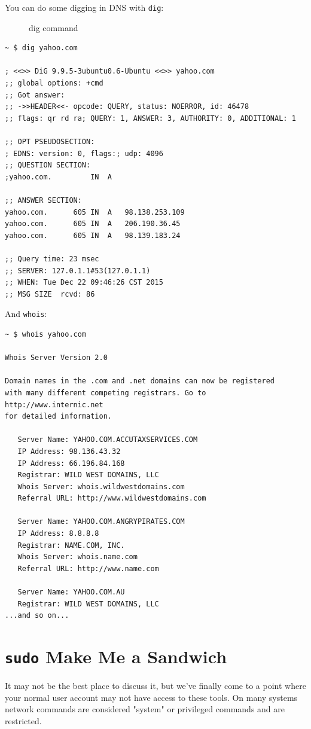 \documentclass[10pt,]{book}
\numberwithin{figure}{chapter}
\DeclareRobustCommand{\drcap}[1]{\begin{figure}[H]\caption{#1}\end{figure}}
\DeclareRobustCommand{\drcmd}[1]{\index{Commands!#1}}
\begin{document}
You can do some digging in DNS with \texttt{dig}\drcmd{dig}:

\drcap{dig command}

\begin{verbatim}
~ $ dig yahoo.com

; <<>> DiG 9.9.5-3ubuntu0.6-Ubuntu <<>> yahoo.com
;; global options: +cmd
;; Got answer:
;; ->>HEADER<<- opcode: QUERY, status: NOERROR, id: 46478
;; flags: qr rd ra; QUERY: 1, ANSWER: 3, AUTHORITY: 0, ADDITIONAL: 1

;; OPT PSEUDOSECTION:
; EDNS: version: 0, flags:; udp: 4096
;; QUESTION SECTION:
;yahoo.com.         IN  A

;; ANSWER SECTION:
yahoo.com.      605 IN  A   98.138.253.109
yahoo.com.      605 IN  A   206.190.36.45
yahoo.com.      605 IN  A   98.139.183.24

;; Query time: 23 msec
;; SERVER: 127.0.1.1#53(127.0.1.1)
;; WHEN: Tue Dec 22 09:46:26 CST 2015
;; MSG SIZE  rcvd: 86
\end{verbatim}

And \texttt{whois}\drcmd{whois}:

\begin{verbatim}
~ $ whois yahoo.com

Whois Server Version 2.0

Domain names in the .com and .net domains can now be registered
with many different competing registrars. Go to http://www.internic.net
for detailed information.

   Server Name: YAHOO.COM.ACCUTAXSERVICES.COM
   IP Address: 98.136.43.32
   IP Address: 66.196.84.168
   Registrar: WILD WEST DOMAINS, LLC
   Whois Server: whois.wildwestdomains.com
   Referral URL: http://www.wildwestdomains.com

   Server Name: YAHOO.COM.ANGRYPIRATES.COM
   IP Address: 8.8.8.8
   Registrar: NAME.COM, INC.
   Whois Server: whois.name.com
   Referral URL: http://www.name.com

   Server Name: YAHOO.COM.AU
   Registrar: WILD WEST DOMAINS, LLC
...and so on...
\end{verbatim}

\section*{\texttt{sudo} Make Me a
Sandwich}\label{sudo-make-me-a-sandwich}

It may not be the best place to discuss it, but we've finally come to a
point where your normal user account may not have access to these tools.
On many systems network commands are considered "system" or privileged
commands and are restricted.
\end{document}
